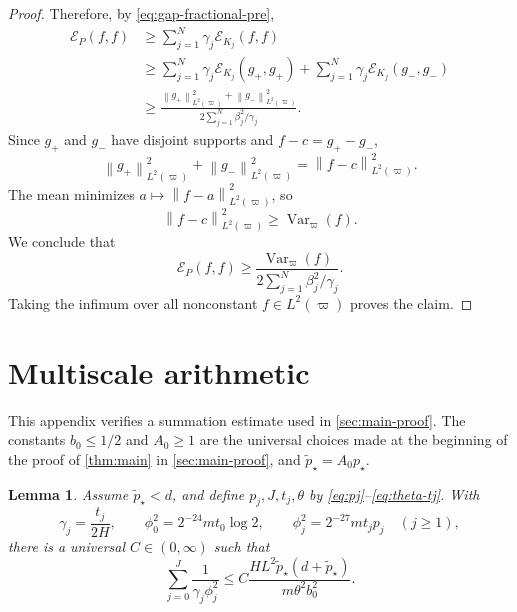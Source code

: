 \documentclass[11pt]{article}
\newtheorem{lemma}[lemma]{Lemma}
\newcommand{\Var}{\operatorname{Var}}
\newcommand{\cE}{\mathcal E}
\newcommand{\norm}[1]{\left\lVert #1\right\rVert}
\newcommand{\1}{\mathbf 1}
\begin{document}
\begin{proof}
		Therefore, by \eqref{eq:gap-fractional-pre},
		\[
		\begin{aligned}
			\cE_P(f,f)
			&\geq
			\sum_{j=1}^N
			\gamma_j\cE_{K_j}(f,f)\\
			&\geq
			\sum_{j=1}^N
			\gamma_j\cE_{K_j}(g_+,g_+)
			+
			\sum_{j=1}^N
			\gamma_j\cE_{K_j}(g_-,g_-)\\
			&\geq
			\frac{
				\norm{g_+}_{L^2(\varpi)}^2
				+
				\norm{g_-}_{L^2(\varpi)}^2
			}{
				2\sum_{j=1}^N \beta_j^2/\gamma_j
			}.
		\end{aligned}
		\]
		Since \(g_+\) and \(g_-\) have disjoint supports and \(f-c=g_+-g_-\),
		\[
		\norm{g_+}_{L^2(\varpi)}^2
		+
		\norm{g_-}_{L^2(\varpi)}^2
		=
		\norm{f-c}_{L^2(\varpi)}^2.
		\]
		The mean minimizes \(a\mapsto\norm{f-a}_{L^2(\varpi)}^2\), so
		\[
		\norm{f-c}_{L^2(\varpi)}^2
		\geq
		\Var_\varpi(f).
		\]
		We conclude that
		\[
		\cE_P(f,f)
		\geq
		\frac{
			\Var_\varpi(f)
		}{
			2\sum_{j=1}^N \beta_j^2/\gamma_j
		}.
		\]
		Taking the infimum over all nonconstant \(f\in L^2(\varpi)\) proves the
		claim.
	\end{proof}
	
	\section{Multiscale arithmetic}
	
	This appendix verifies a summation estimate used in
	\cref{sec:main-proof}.  The constants \(b_0 \leq 1/2\) and \(A_0 \geq 1\) are the universal
	choices made at the beginning of the proof of \cref{thm:main} in \cref{sec:main-proof}, and $\widetilde p_\star=A_0p_\star$.
	
	
	
	\begin{lemma} \label{lem:ladder-sum}
		Assume \( \widetilde p_\star <d\), and define \(p_j,J,t_j,\theta\) by
		\eqref{eq:pj}--\eqref{eq:theta-tj}.  With
		\[
		\gamma_j=\frac{t_j}{2H},
		\qquad
		\phi_0^2= 2^{-24} m t_0\log 2,
		\qquad
		\phi_j^2= 2^{-27} m t_jp_j\quad(j\geq1),
		\]
		there is a universal \(C \in (0,\infty)\) such that
		\[
		\sum_{j=0}^J\frac1{\gamma_j\phi_j^2}
		\leq
		C\frac{HL^2 \widetilde p_\star (d+ \widetilde p_\star )}
		{m\theta^2b_0^2}.
		\]
	\end{lemma}
	
\end{document}
